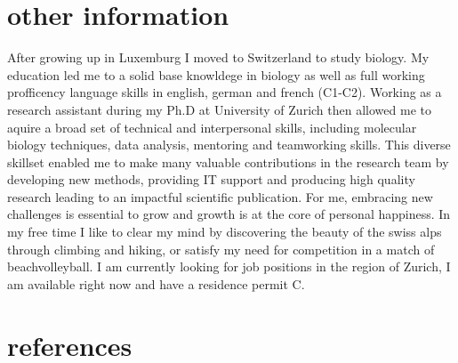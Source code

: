 \documentclass[]{twentysecondcv}
\begin{document}
\section{other information}
After growing up in Luxemburg I moved to Switzerland to study biology. My education led me to a solid base knowldege in biology as well as full working profficency language skills in english, german and french (C1-C2). Working as a research assistant during my Ph.D at University of Zurich then allowed me to aquire a broad set of technical and interpersonal skills, including molecular biology techniques, data analysis, mentoring and teamworking skills. This diverse skillset enabled me to make many valuable contributions in the research team by developing new methods, providing IT support and producing high quality research leading to an impactful scientific publication. For me, embracing new challenges is essential to grow and growth is at the core of personal happiness. In my free time I like to clear my mind by discovering the beauty of the swiss alps through climbing and hiking, or satisfy my need for competition in a match of beachvolleyball. I am currently looking for job positions in the region of Zurich, I am available right now and have a residence permit C.

\section{references}

\end{document}
